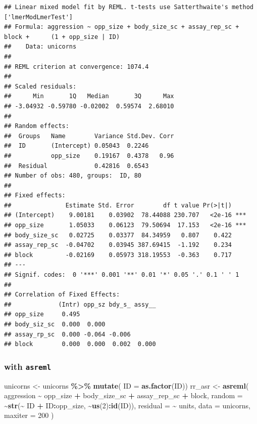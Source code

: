 \documentclass[
  12pt,
]{book}
\newenvironment{Shaded}{\begin{snugshade}}{\end{snugshade}}
\newcommand{\DataTypeTok}[1]{\textcolor[rgb]{0.13,0.29,0.53}{#1}}
\newcommand{\DecValTok}[1]{\textcolor[rgb]{0.00,0.00,0.81}{#1}}
\newcommand{\KeywordTok}[1]{\textcolor[rgb]{0.13,0.29,0.53}{\textbf{#1}}}
\newcommand{\NormalTok}[1]{#1}
\newcommand{\OperatorTok}[1]{\textcolor[rgb]{0.81,0.36,0.00}{\textbf{#1}}}
\newcommand{\StringTok}[1]{\textcolor[rgb]{0.31,0.60,0.02}{#1}}
\begin{document}
\begin{verbatim}
## Linear mixed model fit by REML. t-tests use Satterthwaite's method ['lmerModLmerTest']
## Formula: aggression ~ opp_size + body_size_sc + assay_rep_sc + block +      (1 + opp_size | ID)
##    Data: unicorns
## 
## REML criterion at convergence: 1074.4
## 
## Scaled residuals: 
##      Min       1Q   Median       3Q      Max 
## -3.04932 -0.59780 -0.02002  0.59574  2.68010 
## 
## Random effects:
##  Groups   Name        Variance Std.Dev. Corr
##  ID       (Intercept) 0.05043  0.2246       
##           opp_size    0.19167  0.4378   0.96
##  Residual             0.42816  0.6543       
## Number of obs: 480, groups:  ID, 80
## 
## Fixed effects:
##               Estimate Std. Error        df t value Pr(>|t|)    
## (Intercept)    9.00181    0.03902  78.44088 230.707   <2e-16 ***
## opp_size       1.05033    0.06123  79.50694  17.153   <2e-16 ***
## body_size_sc   0.02725    0.03377  84.34959   0.807    0.422    
## assay_rep_sc  -0.04702    0.03945 387.69415  -1.192    0.234    
## block         -0.02169    0.05973 318.19553  -0.363    0.717    
## ---
## Signif. codes:  0 '***' 0.001 '**' 0.01 '*' 0.05 '.' 0.1 ' ' 1
## 
## Correlation of Fixed Effects:
##             (Intr) opp_sz bdy_s_ assy__
## opp_size     0.495                     
## body_siz_sc  0.000  0.000              
## assay_rp_sc  0.000 -0.064 -0.006       
## block        0.000  0.000  0.002  0.000
\end{verbatim}

\hypertarget{with-asreml}{%
\subsubsection{\texorpdfstring{with \texttt{asreml}}{with asreml}}\label{with-asreml}}

\begin{Shaded}
\begin{Highlighting}[]
\NormalTok{unicorns \textless{}{-}}\StringTok{ }\NormalTok{unicorns }\OperatorTok{\%\textgreater{}\%}
\StringTok{  }\KeywordTok{mutate}\NormalTok{( }\DataTypeTok{ID =} \KeywordTok{as.factor}\NormalTok{(ID))}
\NormalTok{rr\_asr \textless{}{-}}\StringTok{ }\KeywordTok{asreml}\NormalTok{(}
\NormalTok{  aggression }\OperatorTok{\textasciitilde{}}\StringTok{ }\NormalTok{opp\_size }\OperatorTok{+}\StringTok{ }\NormalTok{body\_size\_sc }\OperatorTok{+}\StringTok{ }\NormalTok{assay\_rep\_sc }\OperatorTok{+}\StringTok{ }\NormalTok{block,}
  \DataTypeTok{random =} \OperatorTok{\textasciitilde{}}\KeywordTok{str}\NormalTok{(}\OperatorTok{\textasciitilde{}}\StringTok{ }\NormalTok{ID }\OperatorTok{+}\StringTok{ }\NormalTok{ID}\OperatorTok{:}\NormalTok{opp\_size, }\OperatorTok{\textasciitilde{}}\KeywordTok{us}\NormalTok{(}\DecValTok{2}\NormalTok{)}\OperatorTok{:}\KeywordTok{id}\NormalTok{(ID)),}
  \DataTypeTok{residual =} \OperatorTok{\textasciitilde{}}\StringTok{ }\NormalTok{units,}
  \DataTypeTok{data =}\NormalTok{ unicorns,}
  \DataTypeTok{maxiter =} \DecValTok{200}
\NormalTok{)}
\end{Highlighting}
\end{Shaded}
\end{document}
